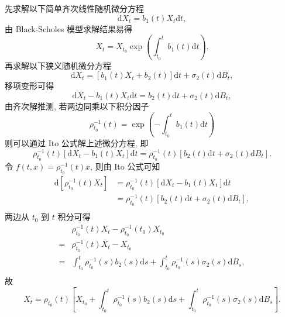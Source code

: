 \documentclass[openany]{ctexbook}
\theoremstyle{kaiti}
\theoremstyle{normal}
\begin{document}
先求解以下简单齐次线性随机微分方程
\begin{equation}
  \mathrm{d}X_t=b_1(t) X_t\mathrm{d}t,
\end{equation}
由 Black-Scholes 模型求解结果易得
\begin{equation}
  X_t=X_{t_0}\exp\left(\int_{t_0}^tb_1(t)\mathrm{d}t\right).
\end{equation}
再求解以下狭义随机微分方程
\begin{equation}
  \mathrm{d}X_t=[b_1(t) X_t+b_2(t)]\mathrm{d}t+\sigma_2(t)\mathrm{d}B_t,
\end{equation}
移项变形可得
\begin{equation}
  \mathrm{d}X_t-b_1(t) X_t\mathrm{d}t=b_2(t)\mathrm{d}t+\sigma_2(t)\mathrm{d}B_t,
\end{equation}
由齐次解推测, 若两边同乘以下积分因子
\begin{equation}
  \rho_{t_0}^{-1}(t)=\exp\left(-\int_{t_0}^tb_1(t)\mathrm{d}t\right)
\end{equation}
则可以通过 Ito 公式解上述微分方程, 即
\begin{equation}
  \rho_{t_0}^{-1}(t)[\mathrm{d}X_t-b_1(t) X_t]\mathrm{d}t=\rho_{t_0}^{-1}(t)[b_2(t)\mathrm{d}t+\sigma_2(t)\mathrm{d}B_t].
\end{equation}
令 $f(t,x)=\rho_{t_0}^{-1}(t)x$, 则由 Ito 公式可知
\begin{equation}
  \begin{aligned}
  \mathrm{d}\left[\rho_{t_0}^{-1}(t)X_t\right]
  &=\rho_{t_0}^{-1}(t)[\mathrm{d}X_t-b_1(t) X_t]\mathrm{d}t\\
  &=\rho_{t_0}^{-1}(t)[b_2(t)\mathrm{d}t+\sigma_2(t)\mathrm{d}B_t],\\
  \end{aligned}
\end{equation}
两边从 $t_0$ 到 $t$ 积分可得
\begin{equation}
  \begin{aligned}
    &\rho_{t_0}^{-1}(t)X_t-\rho_{t_0}^{-1}(t_0)X_{t_0}\\
    =&\rho_{t_0}^{-1}(t)X_t-X_{t_0}\\
    =&\int_{t_0}^t\rho_{t_0}^{-1}(s)b_2(s)\mathrm{d}s+\int_{t_0}^t\rho_{t_0}^{-1}(s)\sigma_2(s)\mathrm{d}B_s,\\
  \end{aligned}
\end{equation}
故
\begin{equation}
  X_t=\rho_{t_0}(t)\left[X_{t_0}+\int_{t_0}^t\rho_{t_0}^{-1}(s)b_2(s)\mathrm{d}s+\int_{t_0}^t\rho_{t_0}^{-1}(s)\sigma_2(s)\mathrm{d}B_s\right].
\end{equation}
\end{document}
